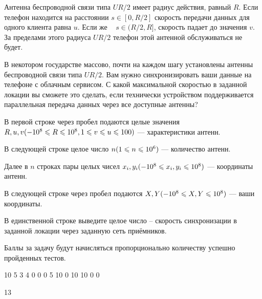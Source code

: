 
Антенна беспроводной связи типа $UR/2$ имеет радиус действия, равный $R$. Если телефон находится 
на расстоянии $s \in [0, R/2]$  скорость передачи данных для одного клиента равна $u$. Если же  
$s \in (R/2, R]$, скорость падает до значения $v$. За пределами этого радиуса $UR/2$ телефон этой 
антенной обслуживаться не будет.

В некотором государстве массово, почти на каждом шагу установлены антенны беспроводной связи типа 
$UR/2$. Вам нужно синхронизировать ваши данные на телефоне с облачным сервисом. 
С какой максимальной скоростью в заданной локации вы сможете это сделать, 
если технически устройством поддерживается параллельная передача данных через все доступные антенны?

В первой строке через пробел подаются целые значения $R, u, v\space(-10^8\leq R\leq 10^8,\space 1\leq v \leq u \leq 100)$ — 
характеристики антенн.

В следующей строке целое число $n\space (1\leq n\leq 10^6)$  — количество антенн. 

Далее в $n$ строках пары целых чисел $x_i, y_i \space (-10^8\leq x_i, y_i \leq 10^8)$  — координаты антенн.

В следующей строке через пробел подаются $X, Y \space (-10^8\leq X, Y \leq 10^8)$ — ваши координаты.

\outputfmtSection
В единственной строке выведите целое число -- скорость синхронизации в заданной локации через заданную сеть приёмников.

\markSection

Баллы за задачу будут начисляться пропорционально количеству успешно пройденных тестов.


\begin{myverbbox}[\small]{\vinput}
    10 5 3
    4
    0 0
    0 5
    10 0
    10 10
    0 0
\end{myverbbox}

\begin{myverbbox}[\small]{\voutput}
    13
\end{myverbbox}

